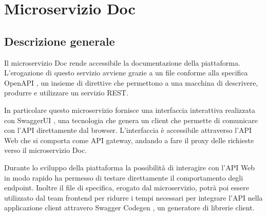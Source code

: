 \section{Microservizio Doc}
\subsection{Descrizione generale}
Il microservizio Doc rende accessibile la documentazione della piattaforma.
L'erogazione di questo servizio avviene grazie a un file conforme alla specifica OpenAPI \cite{openAPI},
un insieme di direttive che permettono a una macchina di descrivere, produrre e utilizzare
un servizio REST.

In particolare questo microservizio fornisce una interfaccia interattiva realizzata con
SwaggerUI \cite{SwaggerUI}, una tecnologia che genera un client che permette di comunicare con l'API direttamente
dal browser. L'interfaccia è accessibile attraverso l'API Web che si comporta
come API gateway, andando a fare il proxy delle richieste verso il microservizio Doc.

Durante lo sviluppo della piattaforma la possibilità di interagire con l'API Web in modo rapido ha permesso
di testare direttamente il comportamento degli endpoint. Inoltre il file di specifica, erogato dal microservizio,
potrà poi essere utilizzato dal team frontend per ridurre i tempi necessari per integrare l'API nella applicazione client
attravero Swagger Codegen \cite{SwaggerCodegen}, un generatore di librerie client.